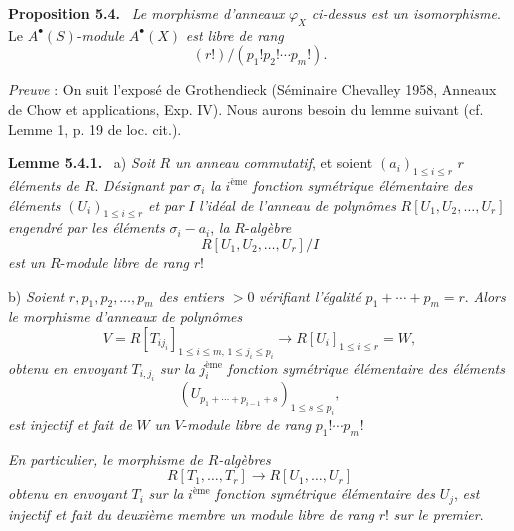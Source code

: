 \documentclass[11pt]{article}
\newenvironment{statement}[1]{\par\medskip\noindent\textbf{#1.}\ }{\par\medskip}
\begin{document}
\begin{statement}{Proposition 5.4}
\emph{Le morphisme d'anneaux} $\varphi_X$ \emph{ci-dessus est un isomorphisme}. Le $A^{\bullet}(S)$-\emph{module} $A^{\bullet}(X)$ \emph{est libre de rang}
\[
(r!)/(p_1!p_2!\cdots p_m!).
\]
\end{statement}

\emph{Preuve} : On
suit l'exposé de Grothendieck (Séminaire Chevalley 1958, Anneaux de Chow et applications, Exp. IV). Nous aurons besoin du lemme suivant (cf. Lemme 1, p. 19 de loc. cit.).

\begin{statement}{Lemme 5.4.1}
a) \emph{Soit} $R$ \emph{un anneau commutatif}, et soient $(a_i)_{1\le i\le r}$ $r$ \emph{éléments de} $R$. \emph{Désignant par} $\sigma_i$ \emph{la} $i^{\text{ème}}$ \emph{fonction symétrique élémentaire des éléments} $(U_i)_{1\le i\le r}$ \emph{et par} $I$ \emph{l'idéal de l'anneau de polynômes} $R[U_1,U_2,\ldots,U_r]$ \emph{engendré par les éléments} $\sigma_i-a_i$, \emph{la} $R$-\emph{algèbre}
\[
R[U_1,U_2,\ldots,U_r]/I
\]
\emph{est un} $R$-\emph{module libre de rang} $r!$

b) \emph{Soient} $r,p_1,p_2,\ldots,p_m$ \emph{des entiers} $>0$ \emph{vérifiant l'égalité} $p_1+\cdots+p_m=r$. \emph{Alors le morphisme d'anneaux de polynômes}
\[
V=R[T_{ij_i}]_{1\le i\le m,\,1\le j_i\le p_i}
\longrightarrow R[U_i]_{1\le i\le r}=W,
\]
\emph{obtenu en envoyant} $T_{i,j_i}$ \emph{sur la} $j_i^{\text{ème}}$ \emph{fonction symétrique élémentaire des éléments}
\[
(U_{p_1+\cdots+p_{i-1}+s})_{1\le s\le p_i},
\]
\emph{est injectif et fait de} $W$ \emph{un} $V$-\emph{module libre de rang} $p_1!\cdots p_m!$

\emph{En particulier, le morphisme de $R$-algèbres}
\[
R[T_1,\ldots,T_r]\to R[U_1,\ldots,U_r]
\]
\emph{obtenu en envoyant} $T_i$ \emph{sur la} $i^{\text{ème}}$ \emph{fonction symétrique élémentaire des} $U_j$, \emph{est injectif et fait du deuxième membre un module libre de rang} $r!$ \emph{sur le premier}.
\end{statement}
\end{document}
